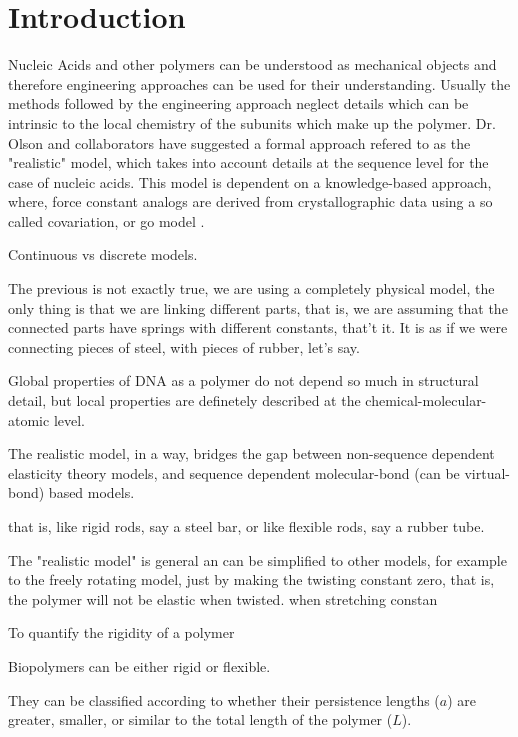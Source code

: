 \part{Introduction}

Nucleic Acids and other polymers can be understood as mechanical
objects \cite{marko2003, nelson2004} and therefore engineering
approaches can be used for their understanding. Usually the methods
followed by the engineering approach neglect details which can be
intrinsic to the local chemistry of the subunits which make up the
polymer. Dr. Olson and collaborators have suggested a formal approach
refered to as the "realistic" model, which takes into account details
at the sequence level for the case of nucleic acids. This model is
dependent on a knowledge-based approach, where, force constant analogs
are derived from crystallographic data using a so called covariation,
or go model \cite{go1974}.





Continuous vs discrete models.





The previous is not exactly true, we are using a completely physical
model, the only thing is that we are linking different parts, that is,
we are assuming that the connected parts have springs with different
constants, that't it. It is as if we were connecting pieces of steel,
with pieces of rubber, let's say.


Global properties of DNA as a polymer do not depend so much in
structural detail, but local properties are definetely described at
the chemical-molecular-atomic level.

The realistic model, in a way, bridges the gap between non-sequence
dependent elasticity theory models, and sequence dependent
molecular-bond (can be virtual-bond) based models.


that is, like rigid rods, say a steel bar, or like flexible rods, say
a rubber tube.

The "realistic model" is general an can be simplified to other models,
for example to the freely rotating model, just by making the twisting
constant zero, that is, the polymer will not be elastic when twisted.
when stretching constan 



To quantify the rigidity of a polymer

Biopolymers can be either rigid or flexible. 

They can be classified  according to whether their persistence lengths ($a$)
are greater, smaller, or similar to the total length of the polymer ($L$).

